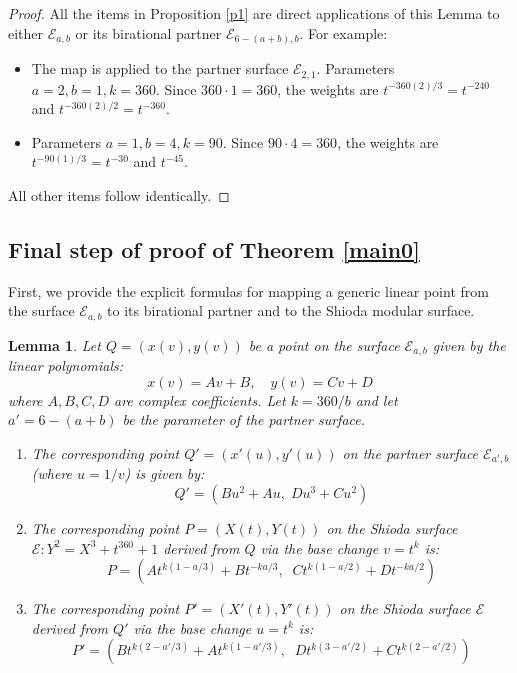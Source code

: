 \documentclass[11pt]{amsart}
\newcommand{\Ee}{{\mathcal E}}
\newtheorem{lema}[thm]{Lemma}
\numberwithin{equation}{section}
\numberwithin{table}{section}
\newcommand\<{\langle}
\begin{document}
\begin{proof}
 All the items in Proposition \ref{p1} are direct applications of this Lemma to either $\Ee_{a,b}$ or its birational partner $\Ee_{6-(a+b),b}$. For example:
\begin{itemize}
	\item[(1)]   The map is applied to the partner surface $\Ee_{2,1}$. Parameters $a=2, b=1, k=360$. Since $360 \cdot 1 = 360$, the weights are $t^{-360(2)/3} = t^{-240}$ and $t^{-360(2)/2} = t^{-360}$.
		\item[(5)]   Parameters $a=1, b=4, k=90$. Since $90 \cdot 4 = 360$, the weights are $t^{-90(1)/3} = t^{-30}$ and $t^{-45}$.
\end{itemize}
All other items follow identically.
\end{proof}



 
\subsection{Final step of proof of Theorem \ref{main0}}


First, we provide the explicit formulas for mapping a generic linear point from the surface $\Ee_{a,b}$ to its birational partner and to the Shioda modular surface.

\begin{lema}
	\label{lem:linear_transform}
	Let $Q = (x(v), y(v))$ be a point on the surface $\Ee_{a,b}$ given by the linear polynomials:
	\[ x(v) = A v + B, \quad y(v) = C v + D \]
	where $A, B, C, D$ are complex coefficients. Let $k = 360/b$ and let $a' = 6-(a+b)$ be the parameter of the partner surface.
	
	\begin{enumerate}
		\item[(i)]  The corresponding point $Q'=(x'(u), y'(u))$ on the partner surface $\Ee_{a', b}$ (where $u=1/v$) is given by:
		\[ Q' = (B u^2 + A u, \; D u^3 + C u^2) \]
		
		\item[(ii)]  The corresponding point $P=(X(t), Y(t))$ on the Shioda surface $\Ee: Y^2 = X^3 + t^{360} + 1$ derived from $Q$ via the base change $v=t^k$ is:
		\[ P = \left( A t^{k(1 - a/3)} + B t^{-ka/3}, \;\; C t^{k(1 - a/2)} + D t^{-ka/2} \right) \]
		
		\item[(iii)] The corresponding point $P'=(X'(t), Y'(t))$ on the Shioda surface $\Ee$ derived from $Q'$ via the base change $u=t^k$ is:
		\[ P' = \left( B t^{k(2 - a'/3)} + A t^{k(1 - a'/3)}, \;\; D t^{k(3 - a'/2)} + C t^{k(2 - a'/2)} \right) \]
	\end{enumerate}
\end{lema}
\end{document}
